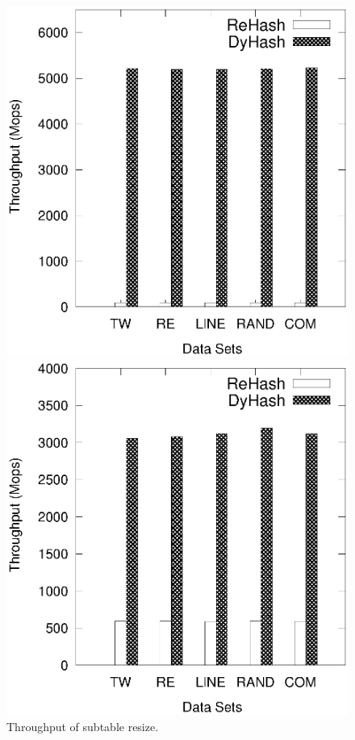 %
\begin{figure}[t]
	\begin{minipage}{0.45\linewidth}\centering
		\includegraphics[width=\linewidth]{pic/compare/upsize.eps}
		\centerline{}
	\end{minipage}
	\hfill
	\begin{minipage}{0.45\linewidth}\centering
		\includegraphics[width=\linewidth]{pic/compare/downsize.eps}
		\centerline{}
	\end{minipage}
	\caption{Throughput of subtable resize.}
	\label{fig:resize}
\end{figure}
